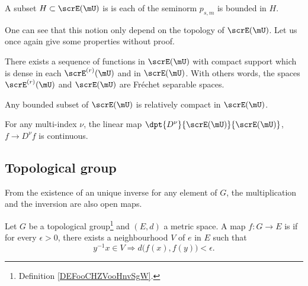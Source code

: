 \begin{definition}
	A subset $H\subset\scrE(\mU)$ is  is each of the seminorm $p_{s,m}$ is bounded in $H$.
	\label{def:bounded}
\end{definition}
One can see that this notion only depend on the topology of $\scrE(\mU)$. Let us once again give some properties without proof.

\begin{proposition}
	There exists a sequence of functions in $\scrE(\mU)$ with compact support which is dense in each $\scrE^{(r)}(\mU)$ and in $\scrE(\mU)$. With others words, the spaces $\scrE^{(r)}(\mU)$ and $\scrE(\mU)$ are Fréchet separable spaces.
	\label{prop:E_Frechet}
\end{proposition}

\begin{proposition}
	Any bounded subset of $\scrE(\mU)$ is relatively compact in $\scrE(\mU)$.
\end{proposition}

\begin{proposition}
	For any multi-index $\nu$, the linear map $\dpt{D^{\nu}}{\scrE(\mU)}{\scrE(\mU)}$, $f\to D^{\nu}f$ is continuous.
\end{proposition}

\subsection{Topological group}



\begin{remark}\label{rem:ouvert}
	From the existence of an unique inverse for any element of $G$, the multiplication and the inversion are also open maps.
\end{remark}

\begin{definition}      \label{DEFooUEBTooDqipcL}
	Let \( G\) be a topological group\footnote{Definition \ref{DEFooCHZVooHnvSgW}.} and \( (E,d)\) a metric space. A map \( f\colon G\to E\) is  if for every \( \epsilon>0\), there exists a neighbourhood \( V\) of \( e\) in \( E\) such that
	\begin{equation}
		y^{-1}x\in V\Rightarrow d\big( f(x),f(y) \big)<\epsilon.
	\end{equation}
\end{definition}


